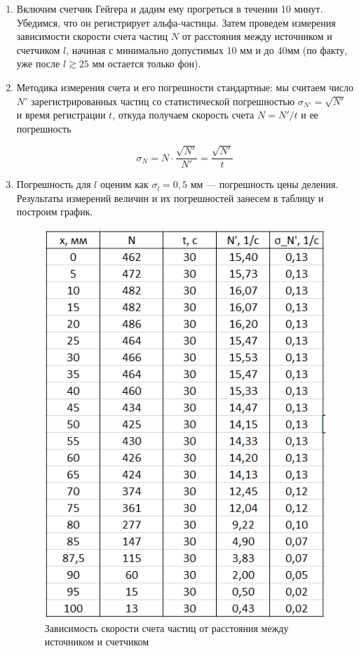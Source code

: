 \documentclass[a4paper, 12pt]{article}%
\begin{document}
\begin{enumerate}	
	
	\item Включим счетчик Гейгера и дадим ему прогреться в течении 10 минут. Убедимся, что он регистрирует альфа-частицы. Затем проведем измерения зависимости скорости счета частиц $ N $ от расстояния между источником и счетчиком $ l $, начиная с минимально допустимых 10 мм и до 40мм (по факту, уже после $ l \gtrsim 25 $ мм остается только фон).
		
	\item Методика измерения счета и его погрешности стандартные: мы считаем число $ N' $ зарегистрированных частиц со статистической погрешностью $ \sigma_{N'}  = \sqrt{N'} $ и время регистрации $ t $, откуда получаем скорость счета $ N = N'/t $ и ее погрешность 
		
		 \begin{equation}\label{}
		\sigma_{N} = N \cdot \dfrac{\sqrt{N'}}{N'} = \dfrac{\sqrt{N'}}{t}
		\end{equation}
	
	\item Погрешность для $ l $ оценим как $ \sigma_l = 0,5 $ мм --- погрешность цены деления. Результаты измерений величин и их погрешностей занесем в таблицу и построим график.
	
	
\begin{center}    
    \begin{figure}[h!]
    \centering
		\includegraphics[width=0.5\linewidth]{images/table_1.png}
		\caption{Зависимость скорости счета частиц от расстояния между источником и счетчиком}
		\label{table 2}
	\end{figure}
\end{center}


\end{enumerate}
\end{document}
